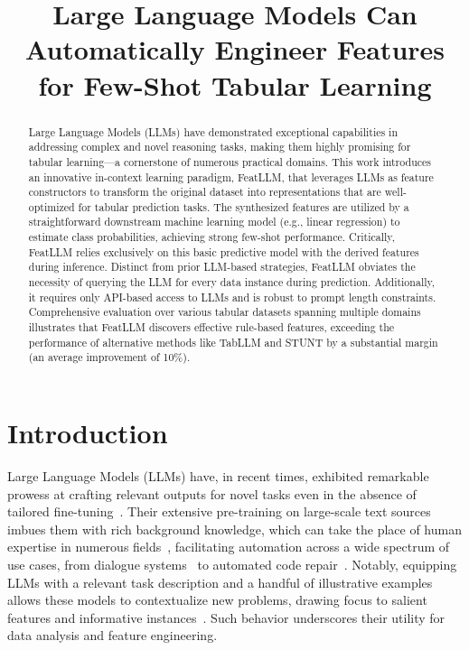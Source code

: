 \title{Large Language Models Can Automatically Engineer Features for Few-Shot Tabular Learning}

\begin{abstract}
Large Language Models (LLMs) have demonstrated exceptional capabilities in addressing complex and novel reasoning tasks, making them highly promising for tabular learning—a cornerstone of numerous practical domains. This work introduces an innovative in-context learning paradigm, \textsf{FeatLLM}, that leverages LLMs as feature constructors to transform the original dataset into representations that are well-optimized for tabular prediction tasks. The synthesized features are utilized by a straightforward downstream machine learning model (e.g., linear regression) to estimate class probabilities, achieving strong few-shot performance. Critically, \textsf{FeatLLM} relies exclusively on this basic predictive model with the derived features during inference. Distinct from prior LLM-based strategies, \textsf{FeatLLM} obviates the necessity of querying the LLM for every data instance during prediction. Additionally, it requires only API-based access to LLMs and is robust to prompt length constraints. Comprehensive evaluation over various tabular datasets spanning multiple domains illustrates that \textsf{FeatLLM} discovers effective rule-based features, exceeding the performance of alternative methods like TabLLM and STUNT by a substantial margin (an average improvement of 10\%).
\end{abstract}

\section{Introduction}
Large Language Models (LLMs) have, in recent times, exhibited remarkable prowess at crafting relevant outputs for novel tasks even in the absence of tailored fine-tuning~\cite{creswell2022selection,imani2023mathprompter,taylor2022galactica}. Their extensive pre-training on large-scale text sources imbues them with rich background knowledge, which can take the place of human expertise in numerous fields~\cite{Genomes2021,singhal2023large,wilcox2003role}, facilitating automation across a wide spectrum of use cases, from dialogue systems~\cite{finch2023leveraging} to automated code repair~\cite{fan2023automated}. Notably, equipping LLMs with a relevant task description and a handful of illustrative examples allows these models to contextualize new problems, drawing focus to salient features and informative instances~\cite{brown2020language,zhao2023survey}. Such behavior underscores their utility for data analysis and feature engineering.

